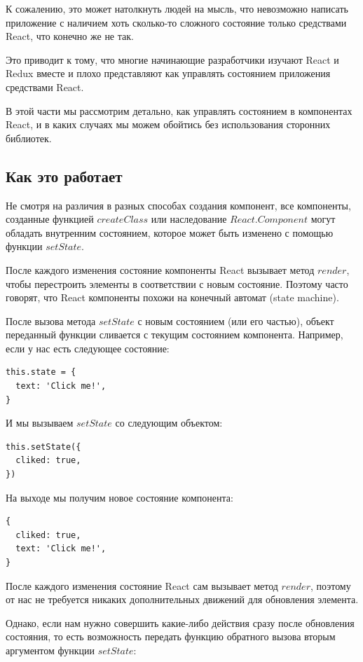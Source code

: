 К сожалению, это может натолкнуть людей на мысль, что невозможно написать приложение с наличием хоть сколько-то сложного состояние только средствами React, что конечно же не так.

Это приводит к тому, что многие начинающие разработчики изучают React и Redux вместе и плохо представляют как управлять состоянием приложения средствами React.

В этой части мы рассмотрим детально, как управлять состоянием в компонентах React, и в каких случаях мы можем обойтись без использования сторонних библиотек.

\subsection*{Как это работает}

Не смотря на различия в разных способах создания компонент, все компоненты, созданные функцией $createClass$ или наследование $React.Component$ могут обладать внутренним состоянием, которое может быть изменено с помощью функции $setState$.

После каждого изменения состояние компоненты React вызывает метод $render$, чтобы перестроить элементы в соответствии с новым состояние. 
Поэтому часто говорят, что React компоненты похожи на конечный автомат (state machine).

После вызова метода $setState$ с новым состоянием (или его частью), объект переданный функции сливается с текущим состоянием компонента. Например, если у нас есть следующее состояние:

\begin{lstlisting}
this.state = {
  text: 'Click me!',
}
\end{lstlisting}

И мы вызываем $setState$ со следующим объектом:

\begin{lstlisting}
this.setState({
  cliked: true,
})
\end{lstlisting}

На выходе мы получим новое состояние компонента:

\begin{lstlisting}
{
  cliked: true,
  text: 'Click me!',
}
\end{lstlisting}

После каждого изменения состояние React сам вызывает метод $render$, поэтому от нас не требуется никаких дополнительных движений для обновления элемента.

Однако, если нам нужно совершить какие-либо действия сразу после обновления состояния, то есть возможность передать функцию обратного вызова вторым аргументом функции $setState$:

